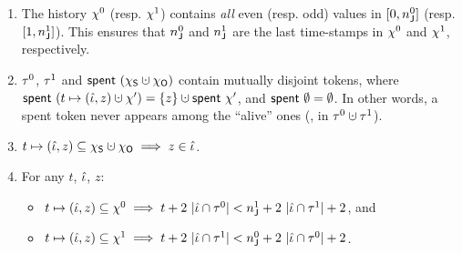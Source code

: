 \begin{enumerate}[label=(\roman*)]
\item\label{cn:ci} 
%
  The history $\chi^0$ (resp. $\chi^1$) contains \emph{all} even
  (resp. odd) values in $[0, n^0_{\mathsf{J}}]$ (resp. $[1, n^1_{\mathsf{J}}]$).
%
%
    This ensures that $n^0_{\mathsf{J}}$ and $n^1_{\mathsf{J}}$ are the last
    time-stamps in $\chi^0$ and $\chi^1$, respectively.

\item\label{cn:ti}  
%
  $\tau^0$, $\tau^1$ and $\Tomb~(\hists \hunion \histo)$ contain
  mutually disjoint tokens, where $\Tomb~(t \mapsto (\tknh, z) \hunion
  \hist') = \{z\} \hunion \Tomb~\hist'$, and $\mathsf{spent}~\emptyset =
  \emptyset$. In other words, a spent token never appears among the
  ``alive'' ones (\ie, in $\tkn^0 \hunion \tkn^1$).


\item\label{cn:ti1}
%
  $t \mapsto (\tknh, z) \subseteq \hists \hunion \histo
  \implies z \in \tknh$. \\[-7pt]

\item\label{cn:ai} 
%
For any $t$, $\hat{\iota}$, $z$: \\[-7pt]
% 
{\small
  \begin{itemize}
  \item   $t \mapsto (\hat{\iota}, z) \subseteq \chi^0 \implies t + 2\ |\hat{\iota}
    \cap \tau^0| < n^1_{\mathsf{J}} + 2\ |\hat{\iota} \cap \tau^1| + 2$, and \\[-7pt]
  \item
    $t \mapsto (\hat{\iota}, z) \subseteq \chi^1 \implies t + 2\ |\hat{\iota} \cap 
    \tau^1| < n^0_{\mathsf{J}} + 2\ |\hat{\iota} \cap \tau^0|
    + 2$.
  \end{itemize}
}
%
\end{enumerate}
\vspace{2pt}
 
